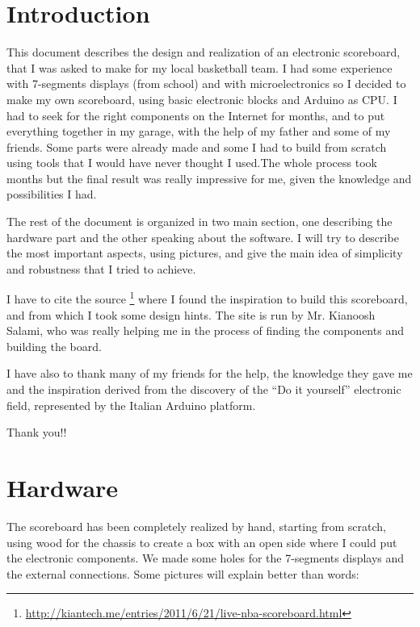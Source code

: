 \documentclass[11pt,english]{article}
\begin{document}
\section{Introduction}

This document describes the design and realization of an electronic scoreboard, 
that I was asked to make for my local basketball team. I had some experience with 
7-segments displays (from school) and with microelectronics so I decided to make 
my own scoreboard, using basic electronic blocks and Arduino as CPU. I had to seek 
for the right components on the Internet for months, and to put everything together 
in my garage, with the help of my father and some of my friends. Some parts were 
already made and some I had to build from scratch using tools that I would have never 
thought I used.The whole process took months but the final result was really 
impressive for me, given the knowledge and possibilities I had.

The rest of the document is organized in two main section, one describing the hardware 
part and the other speaking about the software. I will try to describe the most 
important aspects, using pictures, and give the main idea of simplicity and robustness 
that I tried to achieve.

I have to cite the source \footnote{\url{http://kiantech.me/entries/2011/6/21/live-nba-scoreboard.html}} 
where I found the inspiration to build this scoreboard, and from which I took some 
design hints. The site is run by Mr. Kianoosh Salami, who was really helping me in the 
process of finding the components and building the board.

I have also to thank many of my friends for the help, the knowledge they gave me and the
inspiration derived from the discovery of the \textquotedblleft Do it yourself\textquotedblright 
electronic field, represented by the Italian Arduino platform.   

Thank you!!

\section{Hardware}

The scoreboard has been completely realized by hand, starting from scratch, using wood 
for the chassis to create a box with an open side where I could put the electronic 
components. We made some holes for the 7-segments displays and the external connections.
Some pictures will explain better than words:
\end{document}
